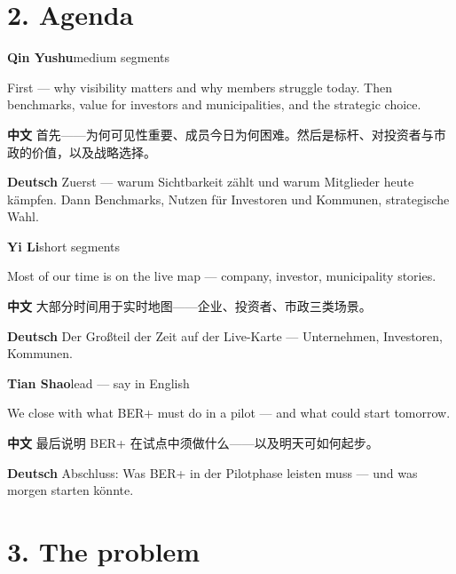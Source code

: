 \documentclass[11pt,a4paper]{ctexart}
\newenvironment{speakerblock}[2]{%
  \par\medskip
  {\color{berblue}\textbf{#1}}\hfill{\small\textcolor{bergrey}{#2}}\par
  \vspace{0.25em}
}{\par\medskip}
\begin{document}
\section{2. Agenda}

\begin{speakerblock}{Qin Yushu}{medium segments}
\begin{englishbox}
First — why visibility matters and why members struggle today. Then benchmarks, value for investors and municipalities, and the strategic choice.
\end{englishbox}

\textbf{中文} 首先——为何可见性重要、成员今日为何困难。然后是标杆、对投资者与市政的价值，以及战略选择。

\textbf{Deutsch} Zuerst — warum Sichtbarkeit zählt und warum Mitglieder heute kämpfen. Dann Benchmarks, Nutzen für Investoren und Kommunen, strategische Wahl.
\end{speakerblock}


\begin{speakerblock}{Yi Li}{short segments}
\begin{englishbox}
Most of our time is on the live map — company, investor, municipality stories.
\end{englishbox}

\textbf{中文} 大部分时间用于实时地图——企业、投资者、市政三类场景。

\textbf{Deutsch} Der Großteil der Zeit auf der Live-Karte — Unternehmen, Investoren, Kommunen.
\end{speakerblock}


\begin{speakerblock}{Tian Shao}{lead — say in English}
\begin{englishbox}
We close with what BER+ must do in a pilot — and what could start tomorrow.
\end{englishbox}

\textbf{中文} 最后说明 BER+ 在试点中须做什么——以及明天可如何起步。

\textbf{Deutsch} Abschluss: Was BER+ in der Pilotphase leisten muss — und was morgen starten könnte.
\end{speakerblock}



\section{3. The problem}
\end{document}
